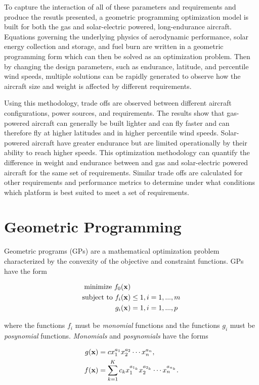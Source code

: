 \documentclass[]{aiaa-tc}%
\begin{document}
To capture the interaction of all of these parameters and requirements and produce the resutls presented, a geometric programming optimization model is built for both the gas and solar-electric powered, long-endurance aircraft.  
Equations governing the underlying physics of aerodynamic performance, solar energy collection and storage, and fuel burn are written in a geometric programming form which can then be solved as an optimization problem.
Then by changing the design parameters, such as endurance, latitude, and percentile wind speeds, multiple solutions can be rapidly generated to observe how the aircraft size and weight is affected by different requirements. 

Using this methodology, trade offs are observed between different aircraft configurations, power sources, and requirements.  
The results show that gas-powered aircraft can generally be built lighter and can fly faster and can therefore fly at higher latitudes and in higher percentile wind speeds.  
Solar-powered aircraft have greater endurance but are limited operationally by their ability to reach higher speeds.  
This optimization methodology can quantify the difference in weight and endurance between and gas and solar-electric powered aircraft for the same set of requirements. 
Similar trade offs are calculated for other requirements and performance metrics to determine under what conditions which platform is best suited to meet a set of requirements.

\section{Geometric Programming\cite{gp}}

Geometric programs (GPs) are a mathematical optimization problem characterized by the convexity of the objective and constraint functions. GPs have the form

\begin{align} 
\label{e:gpform}
\text{minimize } f_0(\bold{x}) & \nonumber \\
\text{subject to  } f_i(\bold{x}) &\leq 1, i=1,...,m \\
g_i (\bold{x}) &= 1, i = 1,...,p \nonumber 
\end{align}

where the functions $f_i$ must be \emph{monomial} functions and the functions $g_i$ must be \emph{posynomial} functions. \emph{Monomials} and \emph{posynomials} have the forms

\begin{align}
 \label{e:mon}
g(\bold{x}) &= c x_1^{a_1} x_2^{a_2} \dotsm x_n^{a_n} , \\
\label{e:pos}
f(\bold{x}) &= \displaystyle\sum_{k=1}^K c_k x_1^{a_{1_k}} x_2^{a_{2_k}} \dotsm x_n^{a_{n_k}}.
\end{align}
\end{document}
